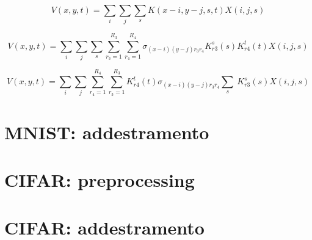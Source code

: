 \begin{equation}
V(x, y, t) = \sum_i \sum_j \sum_sK(x-i, y-j, s, t)X(i, j, s) 

\end{equation}

\begin{equation}
V(x, y, t) = \sum_i \sum_j \sum_s\sum_{r_3=1}^{R_3}\sum_{r_4=1}^{R_4}\sigma_{(x-i)(y-j) r_3 r_4}K^s_{r3}(s)K^t_{r4}(t)X(i, j, s) 
\end{equation}

\begin{equation}
V(x, y, t) = \sum_i \sum_j \sum_{r_4=1}^{R_4}\sum_{r_3=1}^{R_3}K^t_{r4}(t)\sigma_{(x-i)(y-j) r_3 r_4} \sum_s\ K^s_{r3}(s)X(i, j, s) 
\end{equation}

\section{MNIST: addestramento}


\section{CIFAR: preprocessing}




\section{CIFAR: addestramento}













